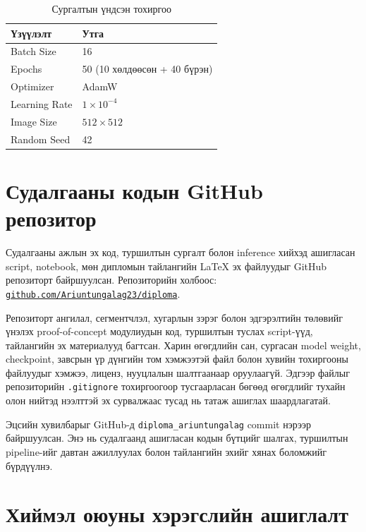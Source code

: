 \begin{table}[ht]
    \centering
    \begin{tabular}{|l|l|}
    \hline
    \textbf{Үзүүлэлт} & \textbf{Утга} \\ \hline
    Batch Size    & 16 \\ \hline
    Epochs        & 50 (10 хөлдөөсөн + 40 бүрэн) \\ \hline
    Optimizer     & AdamW \\ \hline
    Learning Rate & $1\times10^{-4}$ \\ \hline
    Image Size    & $512\times512$ \\ \hline
    Random Seed   & 42 \\ \hline
    \end{tabular}
    \caption{Сургалтын үндсэн тохиргоо}
    \label{tab:appH_train}
\end{table}

\section{Судалгааны кодын GitHub репозитор}

Судалгааны ажлын эх код, туршилтын сургалт болон inference хийхэд ашигласан script, notebook, мөн дипломын тайлангийн \LaTeX{} эх файлуудыг GitHub репозиторт байршуулсан. Репозиторийн холбоос: \href{https://github.com/Ariuntungalag23/diploma}{\texttt{github.com/Ariuntungalag23/diploma}}.

Репозиторт ангилал, сегментчлэл, хугарлын зэрэг болон эдгэрэлтийн төлөвийг үнэлэх proof-of-concept модулиудын код, туршилтын туслах script-үүд, тайлангийн эх материалууд багтсан. Харин өгөгдлийн сан, сургасан model weight, checkpoint, завсрын үр дүнгийн том хэмжээтэй файл болон хувийн тохиргооны файлуудыг хэмжээ, лиценз, нууцлалын шалтгаанаар оруулаагүй. Эдгээр файлыг репозиторийн \texttt{.gitignore} тохиргоогоор тусгаарласан бөгөөд өгөгдлийг тухайн олон нийтэд нээлттэй эх сурвалжаас тусад нь татаж ашиглах шаардлагатай.

Эцсийн хувилбарыг GitHub-д \texttt{diploma\_ariuntungalag} commit нэрээр байршуулсан. Энэ нь судалгаанд ашигласан кодын бүтцийг шалгах, туршилтын pipeline-ийг давтан ажиллуулах болон тайлангийн эхийг хянах боломжийг бүрдүүлнэ.

\section{Хиймэл оюуны хэрэгслийн ашиглалт}

